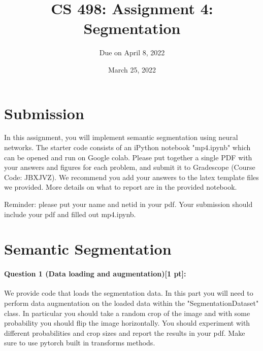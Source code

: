 \documentclass[9pt]{article}
\begin{document}
\author{Due on April 8, 2022}
\title{CS 498: Assignment 4: Segmentation}
\date{March 25, 2022}
\maketitle

\medskip


\section*{Submission}
In this assignment, you will implement semantic segmentation using neural networks. The starter code consists of an iPython notebook "mp4.ipynb" which can be opened and run on Google colab. Please put together a single PDF with your answers and figures for each problem, and submit it to Gradescope (Course Code: JBXJVZ). 
We recommend you add your answers to the latex template files we provided. More details on what to report are in the provided notebook. 

Reminder: please put your name and netid in your pdf.
Your submission should include your pdf and filled out mp4.ipynb.

\section*{Semantic Segmentation} 

\paragraph{Question 1 (Data loading and augmentation)[1 pt]:}
We provide code that loads the segmentation data. In this part you will need to perform data augmentation on the loaded data within the "SegmentationDataset" class. In particular you should take a random crop of the image and with some probability you should flip the image horizontally. You should experiment with different probabilities and crop sizes and report the results in your pdf. Make sure to use pytorch built in transforms methods.
\end{document}
